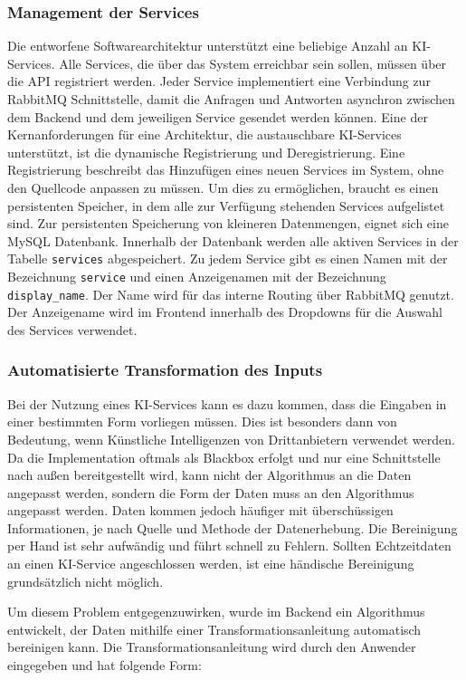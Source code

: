 \subsubsection{Management der Services}
Die entworfene Softwarearchitektur unterstützt eine beliebige Anzahl an KI-Services. Alle Services, die über das System erreichbar sein sollen, müssen über die API registriert werden. Jeder Service implementiert eine Verbindung zur RabbitMQ Schnittstelle, damit die Anfragen und Antworten asynchron zwischen dem Backend und dem jeweiligen Service gesendet werden können. Eine der Kernanforderungen für eine Architektur, die austauschbare KI-Services unterstützt, ist die dynamische Registrierung und Deregistrierung. Eine Registrierung beschreibt das Hinzufügen eines neuen Services im System, ohne den Quellcode anpassen zu müssen. Um dies zu ermöglichen, braucht es einen persistenten Speicher, in dem alle zur Verfügung stehenden Services aufgelistet sind. Zur persistenten Speicherung von kleineren Datenmengen, eignet sich eine MySQL Datenbank. Innerhalb der Datenbank werden alle aktiven Services in der Tabelle \texttt{services} abgespeichert. Zu jedem Service gibt es einen Namen mit der Bezeichnung \texttt{service} und einen Anzeigenamen mit der Bezeichnung \texttt{display\_{}name}. Der Name wird für das interne Routing über RabbitMQ genutzt. Der Anzeigename wird im Frontend innerhalb des Dropdowns für die Auswahl des Services verwendet.

\subsubsection{Automatisierte Transformation des Inputs}
Bei der Nutzung eines KI-Services kann es dazu kommen, dass die Eingaben in einer bestimmten Form vorliegen müssen. Dies ist besonders dann von Bedeutung, wenn Künstliche Intelligenzen von Drittanbietern verwendet werden. Da die Implementation oftmals als Blackbox erfolgt und nur eine Schnittstelle nach außen bereitgestellt wird, kann nicht der Algorithmus an die Daten angepasst werden, sondern die Form der Daten muss an den Algorithmus angepasst werden. Daten kommen jedoch häufiger mit überschüssigen Informationen, je nach Quelle und Methode der Datenerhebung. Die Bereinigung per Hand ist sehr aufwändig und führt schnell zu Fehlern. Sollten Echtzeitdaten an einen KI-Service angeschlossen werden, ist eine händische Bereinigung grundsätzlich nicht möglich.

Um diesem Problem entgegenzuwirken, wurde im Backend ein Algorithmus entwickelt, der Daten mithilfe einer Transformationsanleitung automatisch bereinigen kann. Die Transformationsanleitung wird durch den Anwender eingegeben und hat folgende Form:

